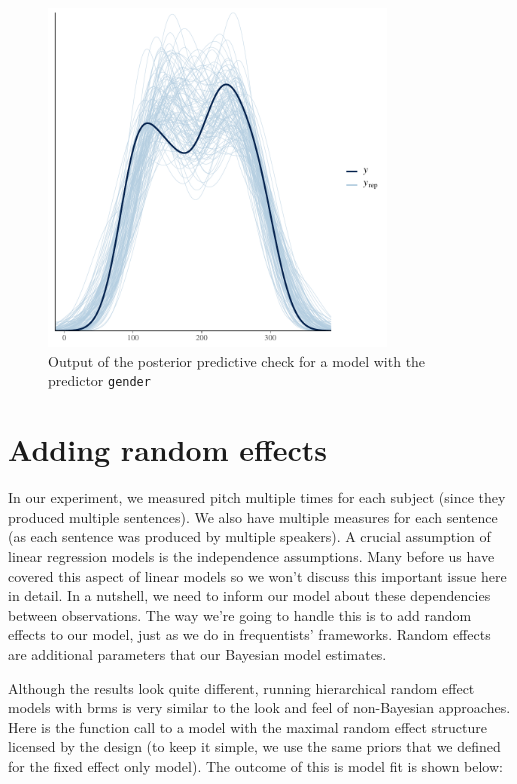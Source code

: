 \documentclass[nobib]{tufte-handout}
\begin{document}
\begin{figure}[]
  \centering
    \includegraphics[width = 0.8\textwidth]{pics/pp_check_FE.pdf}
    \caption{Output of the posterior predictive check for a model with the predictor \texttt{gender}}
    \label{fig:coefficients_table}
\end{figure}


\section{Adding random effects}
In our experiment, we measured pitch multiple times for each subject (since they produced multiple sentences). We also have multiple measures for each sentence (as each sentence was produced by multiple speakers). A crucial assumption of linear regression models is the independence assumptions. Many before us have covered this aspect of linear models \citep[e.g.][]{clark1973language} so we won't discuss this important issue here in detail. In a nutshell, we need to inform our model about these dependencies between observations. The way we’re going to handle this is to add random effects to our model, just as we do in frequentists' frameworks. Random effects are additional parameters that our Bayesian model estimates.

Although the results look quite different, running hierarchical random effect models with \textrm{brms} is very similar to the look and feel of non-Bayesian approaches. Here is the function call to a model with the maximal random effect structure licensed by the design (to keep it simple, we use the same priors that we defined for the fixed effect only model).
The outcome of this is model fit is shown below:
\end{document}
